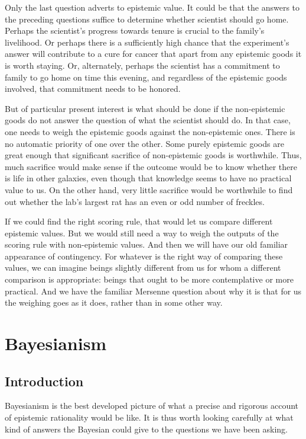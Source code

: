 Only the last question adverts to epistemic value. It could be that the answers to the preceding questions suffice
to determine whether scientist should go home. Perhaps the scientist's progress towards tenure is crucial to the 
family's livelihood. Or perhaps there is a sufficiently high chance that the experiment's answer will contribute
to a cure for cancer that apart from any epistemic goods it is worth staying. Or, alternately, perhaps the scientist
has a commitment to family to go home on time this evening, and regardless of the epistemic goods involved, that
commitment needs to be honored. 

But of particular present interest is what should be done if the non-epistemic
goods do not answer the question of what the scientist should do. In that case, one needs to weigh the
epistemic goods against the non-epistemic ones. There is no automatic priority of one over the other.
Some purely epistemic goods are great enough that significant sacrifice of non-epistemic goods is worthwhile.
Thus, much sacrifice would make sense if the outcome would be to know whether there is life in other galaxies,
even though that knowledge seems to have no practical value to us. On the other hand, very little sacrifice
would be worthwhile to find out whether the lab's largest rat has an even or odd number of freckles.

If we could find the right scoring rule, that would let us compare different epistemic values. But we would
still need a way to weigh the outputs of the scoring rule with non-epistemic values. And then we will have
our old familiar appearance of contingency. For whatever is the right way of comparing these values, we can
imagine beings slightly different from us for whom a different comparison is appropriate: beings that ought
to be more contemplative or more practical. And we have the familiar Mersenne question about why it is that 
for us the weighing goes as it does, rather than in some other way.

\section{Bayesianism}
\subsection{Introduction}
Bayesianism is the best developed picture of what a precise and rigorous account of epistemic rationality would be like.
It is thus worth looking carefully at what kind of answers the Bayesian could give to the questions we have been asking.

